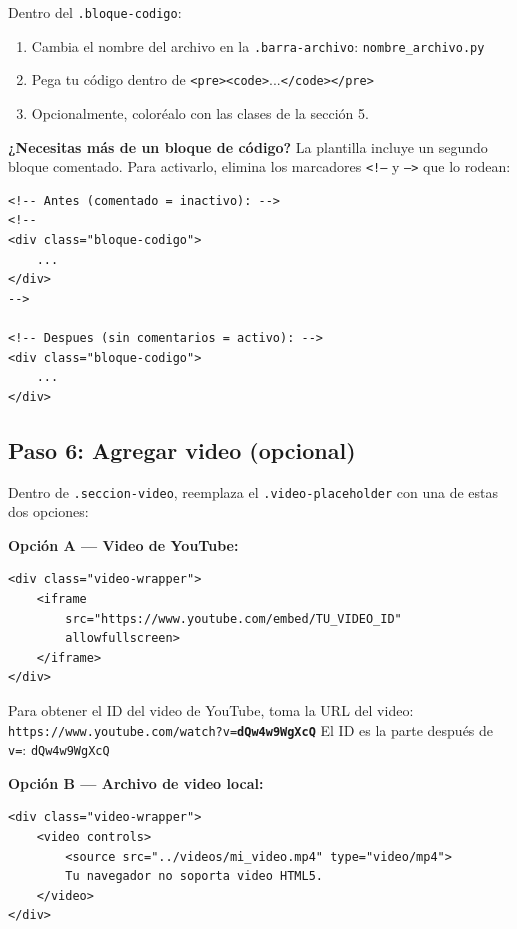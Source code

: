 \documentclass[12pt, a4paper]{article}
\newcommand{\clase}[1]{\texttt{\textcolor{cpAzul}{.#1}}}
\newcommand{\etiquetaHtml}[1]{\texttt{\textcolor{cpKeyword}{<#1>}}}
\begin{document}
Dentro del \clase{bloque-codigo}:

\begin{enumerate}[leftmargin=1.5em]
    \item Cambia el nombre del archivo en la \clase{barra-archivo}: \texttt{nombre\_archivo.py}
    \item Pega tu código dentro de \etiquetaHtml{pre}\etiquetaHtml{code}...\etiquetaHtml{/code}\etiquetaHtml{/pre}
    \item Opcionalmente, coloréalo con las clases de la sección 5.
\end{enumerate}

\textbf{¿Necesitas más de un bloque de código?} La plantilla incluye un segundo
bloque comentado. Para activarlo, elimina los marcadores \texttt{<!--} y \texttt{-->}
que lo rodean:

\begin{lstlisting}[style=htmlstyle, caption={Activar un segundo bloque de código}]
<!-- Antes (comentado = inactivo): -->
<!--
<div class="bloque-codigo">
    ...
</div>
-->

<!-- Despues (sin comentarios = activo): -->
<div class="bloque-codigo">
    ...
</div>
\end{lstlisting}

\subsection{Paso 6: Agregar video (opcional)}

Dentro de \clase{seccion-video}, reemplaza el \clase{video-placeholder}
con una de estas dos opciones:

\textbf{Opción A — Video de YouTube:}
\begin{lstlisting}[style=htmlstyle]
<div class="video-wrapper">
    <iframe
        src="https://www.youtube.com/embed/TU_VIDEO_ID"
        allowfullscreen>
    </iframe>
</div>
\end{lstlisting}

\begin{cajaInfo}
    Para obtener el ID del video de YouTube, toma la URL del video:
    \texttt{https://www.youtube.com/watch?v=\textbf{dQw4w9WgXcQ}}
    El ID es la parte después de \texttt{v=}: \texttt{dQw4w9WgXcQ}
\end{cajaInfo}

\textbf{Opción B — Archivo de video local:}
\begin{lstlisting}[style=htmlstyle]
<div class="video-wrapper">
    <video controls>
        <source src="../videos/mi_video.mp4" type="video/mp4">
        Tu navegador no soporta video HTML5.
    </video>
</div>
\end{lstlisting}
\end{document}
